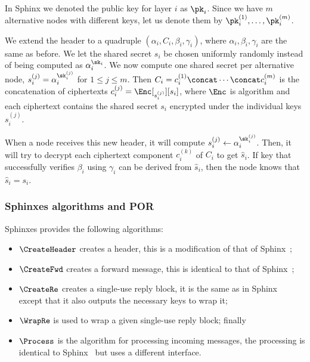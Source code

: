 In Sphinx we denoted the public key for layer \(i\) as \(\pk_i\).
Since we have \(m\) alternative nodes with different keys, let us denote them 
by \(\pk_i^{(1)}, \dotsc, \pk_i^{(m)}\).

We extend the header to a quadruple \((\alpha_i, C_i, \beta_i, \gamma_i)\), 
where \(\alpha_i, \beta_i, \gamma_i\) are the same as before.
We let the shared secret \(s_i\) be chosen uniformly randomly instead of being 
computed as \(\alpha_i^{\sk_i}\).
We now compute one shared secret per alternative node, \ie \(s_i^{(j)} = 
  \alpha_i^{\sk_i^{(j)}}\) for \(1\leq j\leq m\).
Then \(C_i = c_i^{(1)}\concat \dotsb\concat c_i^{(m)}\) is the concatenation of 
ciphertexts \(c_i^{(j)} = \Enc[_{s_i^{(j)}}][s_i]\), where \(\Enc\) is 
 algorithm and each ciphertext contains the shared secret \(s_i\) 
encrypted under the individual keys \(s_i^{(j)}\). 

When a node receives this new header, it will compute \(s_i^{(j)}\gets 
  \alpha_i^{\sk_i^{(j)}}\).
Then, it will try to decrypt each ciphertext component \(c_i^{(k)}\) of \(C_i\) 
to get \(\hat s_i\).
If  key that successfully verifies \(\beta_i\) using \(\gamma_i\) can 
be derived from \(\hat s_i\), then the node knows that \(\hat s_i = s_i\).


\subsubsection{Sphinxes algorithms and \acf*{POR}}

\NewAlgorithm{\CreateHeader}{\Sphinxes[CreateHeader]}
\NewAlgorithm{\CreateFwd}{\Sphinxes[CreateFwd]}
\NewAlgorithm{\CreateRe}{\Sphinxes[CreateReply]}
\NewAlgorithm{\WrapRe}{\Sphinxes[WrapReply]}
\NewAlgorithm{\Process}{\Sphinxes[Process]}

Sphinxes provides the following algorithms:
\begin{itemize}
  \item \(\CreateHeader\) creates a header, this is a modification of that of 
    Sphinx~\cite[\S 3.2]{Sphinx};
  \item \(\CreateFwd\) creates a forward message, this is identical to that of 
    Sphinx~\cite[\S 3.3]{Sphinx};
  \item \(\CreateRe\) creates a single-use reply block, it is the same as in 
    Sphinx~\cite[\S 3.4]{Sphinx} except that it also outputs the necessary keys 
    to wrap it;
  \item \(\WrapRe\) is used to wrap a given single-use reply block; finally
  \item \(\Process\) is the algorithm for processing incoming messages, the 
    processing is identical to Sphinx~\cite[\S 3.6, \S 3.7]{Sphinx} but uses a 
    different interface.
\end{itemize}

